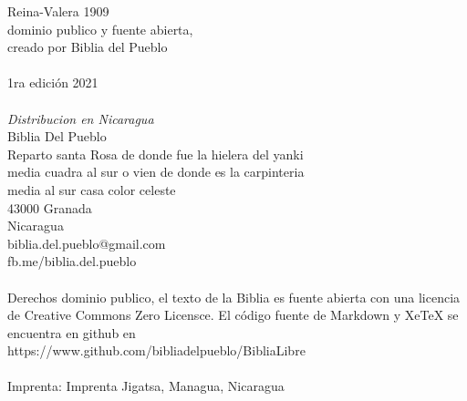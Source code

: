 \hfill\break
Reina-Valera 1909\\
dominio publico y fuente abierta,\\
creado por Biblia del Pueblo\\
~\\
1ra edición 2021\\
~\\
\emph{Distribucion en Nicaragua}\\
Biblia Del Pueblo\\
Reparto santa Rosa de donde fue la hielera del yanki\\
media cuadra al sur o vien de donde es la carpinteria\\
media al sur casa color celeste\\
43000 Granada\\
Nicaragua\\
biblia.del.pueblo@gmail.com\\
fb.me/biblia.del.pueblo\\
~\\
Derechos dominio publico, el texto de la Biblia es fuente abierta con
una licencia de Creative Commons Zero Licensce. El código fuente de
Markdown y XeTeX se encuentra en github en\\
https://www.github.com/bibliadelpueblo/BibliaLibre\\
~\\
Imprenta: Imprenta Jigatsa, Managua, Nicaragua\\
